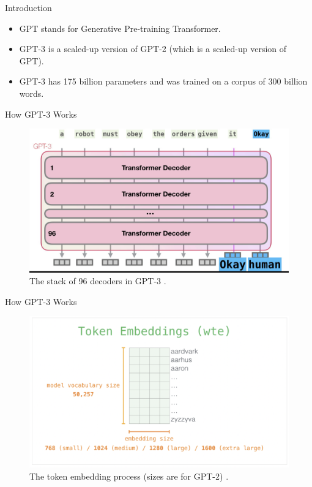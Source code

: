 \documentclass{beamer}
\begin{document}
\begin{frame}{Introduction}
    \begin{itemize}
        \item GPT stands for Generative Pre-training Transformer.
        \item GPT-3 is a scaled-up version of GPT-2 (which is a scaled-up version of GPT).
        \item GPT-3 has 175 billion parameters and was trained on a corpus of 300 billion words.
    \end{itemize}
\end{frame}

\begin{frame}{How GPT-3 Works}
    \begin{figure}
        \centering
        \includegraphics[scale=0.35]{gpt3_decoders}
        \caption{The stack of 96 decoders in GPT-3 \cite{alammar2020}.}
        \label{fig:gpt3_decoders}
    \end{figure}
\end{frame}

\begin{frame}{How GPT-3 Works}
    \begin{figure}
        \centering
        \includegraphics[scale=0.45]{gpt3_token_embeddings}
        \caption{The token embedding process (sizes are for GPT-2) \cite{alammar2019}.}
        \label{fig:gpt3_token_embeddings}
    \end{figure}
\end{frame}
\end{document}
